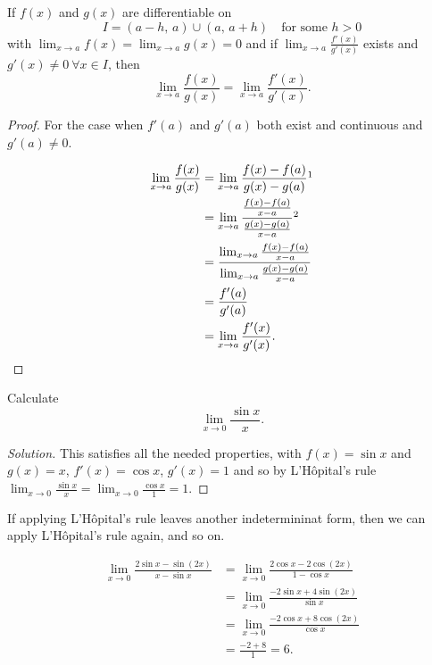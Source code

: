 \documentclass[10pt, a4paper]{article}
\begin{document}
If $f(x)$ and $g(x)$ are differentiable on
\[
I = (a - h,\,a) \cup (a,\,a + h)\quad\text{for some }h > 0
\]
with $\lim_{x \rightarrow a}f(x) = \lim_{x \rightarrow a}g(x) = 0$ and if $\lim_{x \rightarrow a}\frac{f'(x)}{g'(x)}$ exists and $g'(x) \neq 0\ \forall x \in I$, then
\[
\lim_{x \rightarrow a}\frac{f(x)}{g(x)} = \lim_{x \rightarrow a}\frac{f'(x)}{g'(x)}.
\]
\begin{proof}
    For the case when $f'(a)$ and $g'(a)$ both exist and continuous and $g'(a) \neq 0$.

    \begin{align*}
        \lim_{x \rightarrow a}\frac{f(x)}{g(x)} &= \lim_{x \rightarrow a}\frac{f(x) - f(a)}{g(x) - g(a)}\footnotemark \\
        &= \lim_{x \rightarrow a}\frac{\frac{f(x) - f(a)}{x - a}}{\frac{g(x) - g(a)}{x - a}}\footnotemark \\
        &= \frac{\lim_{x \rightarrow a}\frac{f(x) - f(a)}{x - a}}{\lim_{x \rightarrow a}\frac{g(x) - g(a)}{x - a}} \\
        &= \frac{f'(a)}{g'(a)} \\
        &= \lim_{x \rightarrow a}\frac{f'(x)}{g'(x)}.
    \end{align*}
\end{proof}

\begin{example}
    Calculate
    \[
    \lim_{x \rightarrow 0}\frac{\sin x}{x}.
    \]
    \begin{proof}[Solution]\renewcommand{\qedsymbol}{}
        This satisfies all the needed properties,
        with $f(x) = \sin x$ and $g(x) = x$, $f'(x) = \cos x$, $g'(x) = 1$
        and so by L'H\^opital's rule
        $\lim_{x \rightarrow 0}\frac{\sin x}{x} = \lim_{x \rightarrow 0}\frac{\cos x}{1} = 1$.
    \end{proof}
\end{example}

If applying L'H\^opital's rule leaves another indetermininat form,
then we can apply L'H\^opital's rule again, and so on.

\begin{example}
    \begin{align*}
    \lim_{x \rightarrow 0}\frac{2\sin x - \sin (2x)}{x - \sin x} &= \lim_{x \rightarrow 0}\frac{2\cos x - 2\cos (2x)}{1 - \cos x} \\
    &= \lim_{x \rightarrow 0}\frac{-2\sin x + 4\sin(2x)}{\sin x} \\
    &= \lim_{x \rightarrow 0}\frac{-2\cos x + 8\cos (2x)}{\cos x} \\
    &= \frac{-2 + 8}{1} = 6.
    \end{align*}
\end{example}
\end{document}

